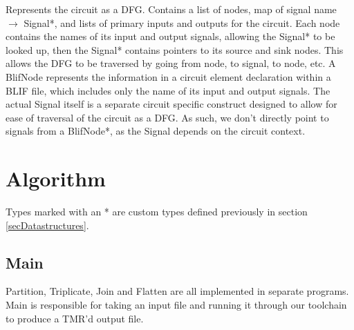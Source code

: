 \documentclass[12pt,final,oneside]{dwThesis} %
\begin{document}
   Represents the circuit as a DFG. Contains a list of nodes, map of signal name $\to$ Signal*, and lists of primary inputs and outputs for the circuit.
   Each node contains the names of its input and output signals, allowing the Signal* to be looked up, then the Signal* contains pointers to its source and sink nodes.
   This allows the DFG to be traversed by going from node, to signal, to node, etc.
   A BlifNode represents the information in a circuit element declaration within a \ac{BLIF} file, which includes only the name of its input and output signals. The actual Signal itself is a separate circuit specific construct designed to allow for ease of traversal of the circuit as a \ac{DFG}.
   As such, we don't directly point to signals from a BlifNode*, as the Signal depends on the circuit context.

   \newpage
   \section{Algorithm}\label{secAlgorithm}
   Types marked with an * are custom types defined previously in section \ref{secDatastructures}.
   \subsection{Main}
   Partition, Triplicate, Join and Flatten are all implemented in separate programs. Main is responsible for taking an input file and running it through our toolchain to produce a TMR'd output file.
\end{document}
